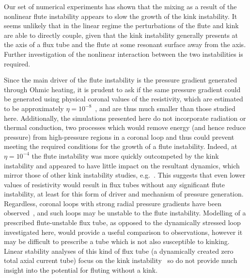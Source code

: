 \documentclass[fleqn,usenatbib]{mnras}
\newcommand{\rs}[2]{{#2}}
\begin{document}
\rs{This set of experiments}{Our set of numerical experiments} has
shown that the mixing as a result of the nonlinear flute
instability appears to slow the growth of the kink instability. \rs{In
  the linear regime it seems unlikely that}{It seems unlikely that in
  the linear regime} the \rs{linear}{} perturbations of \rs{either}{} the
flute \rs{or}{and} kink are able to directly couple, given that
the kink instability generally presents at the axis of a flux tube and
the flute at some resonant surface away from the
axis. Further investigation of the nonlinear interaction between the
two instabilities is required. 

Since the main driver of the flute instability is the
pressure gradient generated through Ohmic heating, it is prudent to
ask if the same pressure gradient could be generated using physical
coronal values of the resistivity, \rs{of}{which are estimated to be}
approximately
$\eta=10^{-8}$~\citep{craigAnisotropicViscousDissipation2009a},
\rs{which are}{and are thus} much smaller than those studied
here. Additionally, the simulations presented here do not incorporate
radiation or thermal \rs{conductivity}{conduction}, two processes which would remove
energy (and \rs{thus}{hence} reduce pressure) from high-pressure regions in a coronal
loop and thus could \rs{remove}{prevent meeting} the required
conditions for the growth of a 
flute instability. \rs{Where}{Indeed, at} $\eta=10^{-4}$ the
flute instability was \rs{}{more} quickly \rs{dominated}{outcompeted} by the kink
instability and appeared to have little impact on the resultant
dynamics, which mirror those of other kink instability studies, \rs{such
as~}{e.g.~}\citep{hoodCoronalHeatingMagnetic2009}. This suggests that even
lower values of resistivity would result in flux tubes without any
significant flute instability, at least for this form of
driver and mechanism of pressure generation. Regardless, coronal loops
with strong radial pressure gradients have been
observed~\citep{foukalTemperatureStructurePressure1975}, and such loops
may be unstable to the flute instability. Modelling of a
prescribed flute-unstable flux tube, as opposed to the dynamically
stressed loop investigated here, would provide a useful comparison to
observations, however it may be difficult to prescribe a tube which is
not also susceptible to kinking. Linear stability analyses of this
kind of flux tube (a dynamically created zero total axial current
tube) focus on the kink
instability~\citep{browningSolarCoronalHeating2003b} so do not provide
much insight into the potential for fluting without a kink. 
\end{document}
